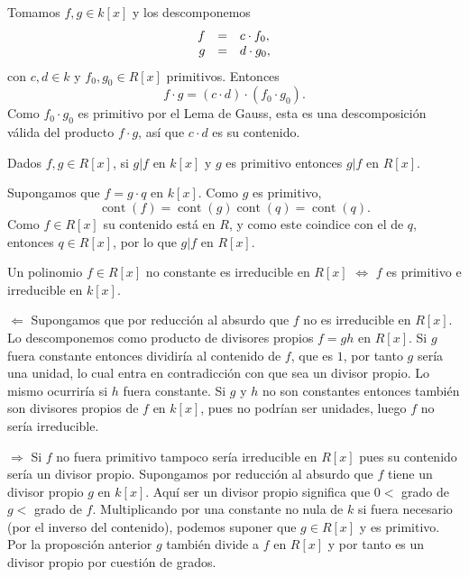 
Tomamos \(f,g\in k[x]\) y los descomponemos
\[\begin{array}{rcl} f&=&c\cdot f_0,\cr g&=&d\cdot g_0, \end{array}\]
con \(c,d\in k\) y \(f_0,g_0\in R[x]\) primitivos. Entonces
\[f\cdot g=(c\cdot d)\cdot (f_0\cdot g_0).\] Como \(f_0\cdot g_0\) es
primitivo por el Lema de Gauss, esta es una descomposición válida del
producto \(f\cdot g\), así que \(c\cdot d\) es su contenido. 


Dados \(f,g\in R[x]\), si \(g|f\) en \(k[x]\) y \(g\) es primitivo
entonces \(g|f\) en \(R[x]\). 


Supongamos que \(f=g\cdot q\) en \(k[x]\). Como \(g\) es primitivo,
\[\operatorname{cont}(f)=\operatorname{cont}(g)\operatorname{cont}(q)=\operatorname{cont}(q).\]
Como \(f\in R[x]\) su contenido está en \(R\), y como este coindice con
el de \(q\), entonces \(q\in R[x]\), por lo que \(g|f\) en \(R[x]\).


Un polinomio \(f\in R[x]\) no constante es irreducible en \(R[x]\)
\(\Leftrightarrow\) \(f\) es primitivo e irreducible en \(k[x]\).


\(\Leftarrow\) Supongamos que por reducción al absurdo que \(f\) no es
irreducible en \(R[x]\). Lo descomponemos como producto de divisores
propios \(f=gh\) en \(R[x]\). Si \(g\) fuera constante entonces
dividiría al contenido de \(f\), que es \(1\), por tanto \(g\) sería una
unidad, lo cual entra en contradicción con que sea un divisor propio. Lo
mismo ocurriría si \(h\) fuera constante. Si \(g\) y \(h\) no son
constantes entonces también son divisores propios de \(f\) en \(k[x]\),
pues no podrían ser unidades, luego \(f\) no sería irreducible.

\(\Rightarrow\) Si \(f\) no fuera primitivo tampoco sería irreducible en
\(R[x]\) pues su contenido sería un divisor propio. Supongamos por
reducción al absurdo que \(f\) tiene un divisor propio \(g\) en
\(k[x]\). Aquí ser un divisor propio significa que \(0<\) grado de
\(g<\) grado de \(f\). Multiplicando por una constante no nula de \(k\)
si fuera necesario (por el inverso del contenido), podemos suponer que
\(g\in R[x]\) y es primitivo. Por la proposción anterior \(g\) también
divide a \(f\) en \(R[x]\) y por tanto es un divisor propio por cuestión
de grados. 

